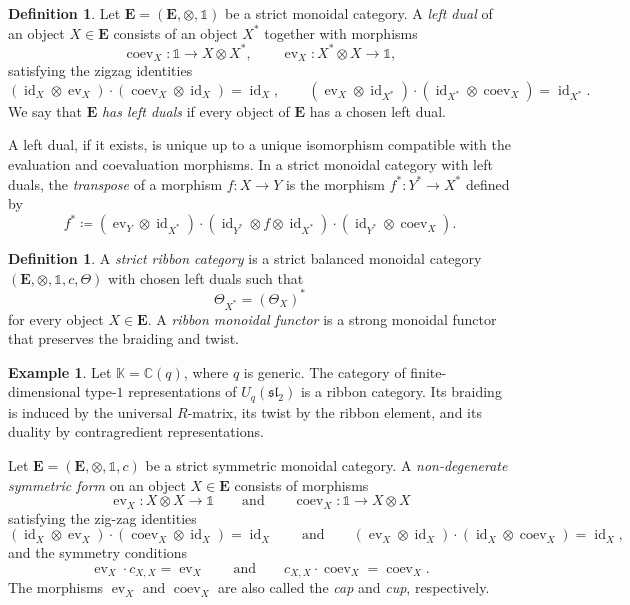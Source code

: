 \documentclass{amsart}
\newcommand{\bE}{\mathbf{E}}
\newcommand{\kk}{\mathbb{K}}    %
\newcommand{\id}{\operatorname{id}}
\newcommand{\ev}{\operatorname{ev}}
\newcommand{\coev}{\operatorname{coev}}
\theoremstyle{definition}
\newtheorem{definition}[theorem]{Definition}%
\newtheorem{example}[theorem]{Example}%
\numberwithin{equation}{section}
\begin{document}
\begin{definition}
Let $\bE=(\bE,\otimes,\mathbb{1})$ be a strict monoidal category.
A \emph{left dual} of an object $X\in\bE$ consists of an object $X^*$
together with morphisms
\[
\coev_X\colon\mathbb{1}\longrightarrow X\otimes X^*,
\qquad
\ev_X\colon X^*\otimes X\longrightarrow\mathbb{1},
\]
satisfying the zigzag identities
\begin{equation}
\label{eq: left dual zig zag equations}
(\id_X\otimes\ev_X)\cdot(\coev_X\otimes\id_X)=\id_X,
\qquad
(\ev_X\otimes\id_{X^*})\cdot(\id_{X^*}\otimes\coev_X)=\id_{X^*}.
\end{equation}
We say that $\bE$ \emph{has left duals} if every object of $\bE$ has
a chosen left dual.
\end{definition}

A left dual, if it exists, is unique up to a unique isomorphism
compatible with the evaluation and coevaluation morphisms. In a
strict monoidal category with left duals, the \emph{transpose} of a
morphism $f\colon X\to Y$ is the morphism $f^*\colon Y^*\to X^*$
defined by
\begin{equation}
\label{eq: transpose of a morphism}
f^*
\coloneqq
(\ev_Y\otimes\id_{X^*})
\cdot
(\id_{Y^*}\otimes f\otimes\id_{X^*})
\cdot
(\id_{Y^*}\otimes\coev_X).
\end{equation}

\begin{definition}
\label{def:ribbon category}
A \emph{strict ribbon category} is a strict balanced monoidal category
$(\bE,\otimes,\mathbb{1},c,\Theta)$ with chosen left duals such that
\[
\Theta_{X^*}=(\Theta_X)^*
\]
for every object $X\in\bE$. A \emph{ribbon monoidal functor} is a strong monoidal functor that
preserves the braiding and twist.
\end{definition}



\begin{example}
Let $\kk=\mathbb{C}(q)$, where $q$ is generic. The category of
finite-dimensional type-$1$ representations of
$U_q(\mathfrak{sl}_2)$ is a ribbon category. Its braiding is induced
by the universal $R$-matrix, its twist by the ribbon element, and
its duality by contragredient representations.
\end{example}

Let $\bE=(\bE,\otimes,\mathbb{1},c)$ be a strict symmetric monoidal
category. A \emph{non-degenerate symmetric form} on an object
$X\in\bE$ consists of morphisms
\[
\ev_X\colon X\otimes X\longrightarrow\mathbb{1}
\qquad \text{and} \qquad
\coev_X\colon\mathbb{1}\longrightarrow X\otimes X
\]
satisfying the zig-zag identities
\begin{equation}
\label{eq:self-dual-zig-zag}
(\id_X\otimes\ev_X)\cdot(\coev_X\otimes\id_X)=\id_X
\qquad \text{and} \qquad
(\ev_X\otimes\id_X)\cdot(\id_X\otimes\coev_X)=\id_X,
\end{equation}
and the symmetry conditions
\begin{equation}
\label{eq:symmetric-form}
\ev_X\cdot c_{X,X}=\ev_X
\qquad \text{and} \qquad
c_{X,X}\cdot\coev_X=\coev_X.
\end{equation}
The morphisms $\ev_X$ and $\coev_X$ are also called the \emph{cap}
and \emph{cup}, respectively.
\end{document}
